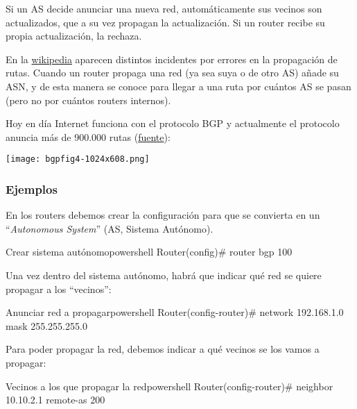 Si un AS decide anunciar una nueva red, automáticamente sus vecinos son actualizados, que a su vez propagan la actualización. Si un router recibe su propia actualización, la rechaza.


En la \href{https://en.wikipedia.org/wiki/BGP_hijacking}{wikipedia} aparecen distintos incidentes por errores en la propagación de rutas.
Cuando un router propaga una red (ya sea suya o de otro AS) añade su ASN, y de esta manera se conoce para llegar a una ruta por cuántos AS se pasan (pero no por cuántos routers internos).

Hoy en día Internet funciona con el protocolo BGP y actualmente el protocolo anuncia más de 900.000 rutas (\href{https://blog.apnic.net/2022/01/06/bgp-in-2021-the-bgp-table/}{fuente}):

\begin{center}
    \vspace{-15pt}
    \texttt{[image: bgpfig4-1024x608.png]}
    \vspace{-25pt}
\end{center}


\subsubsection{Ejemplos}
En los routers debemos crear la configuración para que se convierta en un “\textit{Autonomous System}” (AS, Sistema Autónomo).

\begin{mycode}{Crear sistema autónomo}{powershell}{}
Router(config)# router bgp 100
\end{mycode}

Una vez dentro del sistema autónomo, habrá que indicar qué red se quiere propagar a los “vecinos”:

\begin{mycode}{Anunciar red a propagar}{powershell}{}
Router(config-router)# network 192.168.1.0 mask 255.255.255.0
\end{mycode}

Para poder propagar la red, debemos indicar a qué vecinos se los vamos a propagar:

\begin{mycode}{Vecinos a los que propagar la red}{powershell}{}
Router(config-router)# neighbor 10.10.2.1 remote-as 200
\end{mycode}

